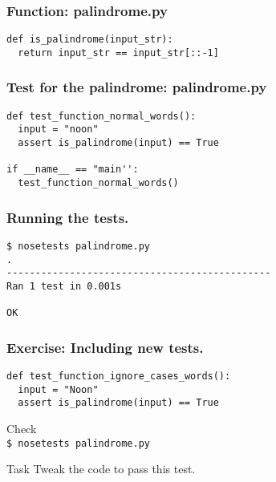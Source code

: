 \documentclass[compress,14pt]{beamer}
\newcommand{\PythonCode}[1]{\lstinline{#1}}
\newcounter{time}
\newcommand{\inctime}[1]{\addtocounter{time}{#1}{\vspace*{0.1in}\tiny \thetime\ m}}
\begin{document}
\begin{frame}[fragile]
    \frametitle{Function: palindrome.py}
\begin{lstlisting}    
def is_palindrome(input_str):
  return input_str == input_str[::-1]
\end{lstlisting}    
\end{frame}

\begin{frame}[fragile]
    \frametitle{Test for the palindrome: palindrome.py}
\begin{lstlisting}    
def test_function_normal_words():
  input = "noon"
  assert is_palindrome(input) == True

if __name__ == "main'':
  test_function_normal_words()
\end{lstlisting}    
\end{frame}

\begin{frame}[fragile]
    \frametitle{Running the tests.}
\begin{lstlisting}    
$ nosetests palindrome.py 
.
----------------------------------------------
Ran 1 test in 0.001s

OK
\end{lstlisting}    
\end{frame}

\begin{frame}[fragile]
    \frametitle{Exercise: Including new tests.}
\begin{lstlisting}    
def test_function_ignore_cases_words():
  input = "Noon"
  assert is_palindrome(input) == True
\end{lstlisting}
     \vspace*{0.25in}
     Check\\
     \PythonCode{$ nosetests palindrome.py} \\
     \begin{block}{Task}
     Tweak the code to pass this test.
     \end{block}
\end{frame}

%
%
%
%
\end{document}
